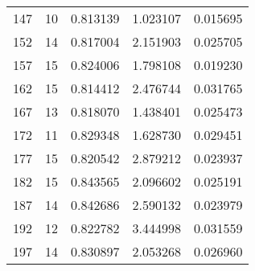 \begin{tabular}{rrrrr}
147 & 10 & 0.813139 & 1.023107 & 0.015695 \\
152 & 14 & 0.817004 & 2.151903 & 0.025705 \\
157 & 15 & 0.824006 & 1.798108 & 0.019230 \\
162 & 15 & 0.814412 & 2.476744 & 0.031765 \\
167 & 13 & 0.818070 & 1.438401 & 0.025473 \\
172 & 11 & 0.829348 & 1.628730 & 0.029451 \\
177 & 15 & 0.820542 & 2.879212 & 0.023937 \\
182 & 15 & 0.843565 & 2.096602 & 0.025191 \\
187 & 14 & 0.842686 & 2.590132 & 0.023979 \\
192 & 12 & 0.822782 & 3.444998 & 0.031559 \\
197 & 14 & 0.830897 & 2.053268 & 0.026960 \\
\bottomrule
\end{tabular}
